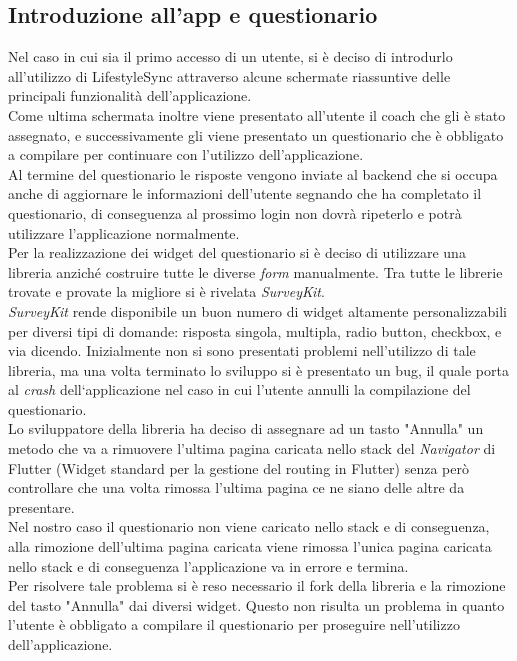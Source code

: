 \subsection{Introduzione all'app e questionario}
Nel caso in cui sia il primo accesso di un utente, si è deciso di introdurlo all'utilizzo di LifestyleSync attraverso alcune schermate riassuntive delle principali funzionalità dell'applicazione.\\
Come ultima schermata inoltre viene presentato all'utente il coach che gli è stato assegnato, e successivamente gli viene presentato un questionario che è obbligato a compilare per continuare con l'utilizzo dell'applicazione.\\
Al termine del questionario le risposte vengono inviate al backend che si occupa anche di aggiornare le informazioni dell'utente segnando che ha completato il questionario, di conseguenza al prossimo login non dovrà ripeterlo e potrà utilizzare l'applicazione normalmente.\\
Per la realizzazione dei widget del questionario si è deciso di utilizzare una libreria anziché costruire tutte le diverse \textit{form} manualmente. Tra tutte le librerie trovate e provate la migliore si è rivelata \textit{SurveyKit}.\\
\textit{SurveyKit} rende disponibile un buon numero di widget altamente personalizzabili per diversi tipi di domande: risposta singola, multipla, radio button, checkbox, e via dicendo. Inizialmente non si sono presentati problemi nell'utilizzo di tale libreria, ma una volta terminato lo sviluppo si è presentato un bug, il quale porta al \textit{crash} dell`applicazione nel caso in cui l'utente annulli la compilazione del questionario.\\
Lo sviluppatore della libreria ha deciso di assegnare ad un tasto "Annulla" un metodo che va a rimuovere l'ultima pagina caricata nello stack del \textit{Navigator} di Flutter (Widget standard per la gestione del routing in Flutter) senza però controllare che una volta rimossa l'ultima pagina ce ne siano delle altre da presentare.\\
Nel nostro caso il questionario non viene caricato nello stack e di conseguenza, alla rimozione dell'ultima pagina caricata viene rimossa l'unica pagina caricata nello stack e di conseguenza l'applicazione va in errore e termina.\\
Per risolvere tale problema si è reso necessario il \gls{fork} della libreria e la rimozione del tasto "Annulla" dai diversi widget. Questo non risulta un problema in quanto l'utente è obbligato a compilare il questionario per proseguire nell'utilizzo dell'applicazione.\\
